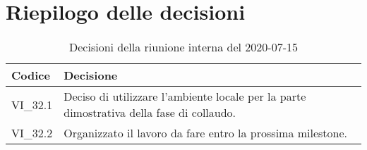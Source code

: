 \section{Riepilogo delle decisioni}
\begin{longtable}{ 
	 >{\centering}p{} >{}p{} }
	
	\caption{Decisioni della riunione interna del 2020-07-15}\\	
	
	\textbf{\color{white}Codice} & 
	\textbf{\color{white}Decisione} 
	\tabularnewline  
	\endhead
	
	VI\_32.1 & Deciso di utilizzare l'ambiente locale per la parte dimostrativa della fase di collaudo. \\
	VI\_32.2 & Organizzato il lavoro da fare entro la prossima milestone\textit{\ped{G}}. \\
\end{longtable}
